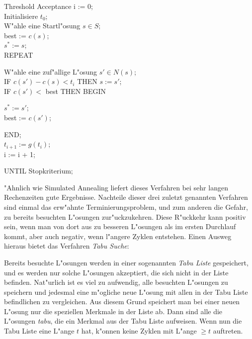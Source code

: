 \begin{algorithm}{Threshold Acceptance}
i := 0;\\
Initialisiere $t_0$;\\
W"ahle eine Startl"osung $s \in S$;\\
best := $c(s)$;\\
$s^* := s$;\\
{REPEAT}
\begin{Block}
	W"ahle eine zuf"allige L"osung $s' \in N(s)$;\\
	{IF} $c(s') - c(s) < t_i$ {THEN} $s := s'$;\\
	{IF} $c(s') < $ best {THEN BEGIN}
	\begin{Block}
		$s^* := s'$;\\
		best := $c(s')$;
	\end{Block}
	{END};\\
	$t_{i+1} := g(t_i)$;\\
	i := i + 1;
\end{Block}
{UNTIL} Stopkriterium;
\end{algorithm}

"Ahnlich wie Simulated Annealing liefert dieses Verfahren bei sehr langen
Rechenzeiten gute Ergebnisse.
Nachteile dieser drei zuletzt genannten Verfahren sind einmal das
erw"ahnte Terminierungsproblem, und zum anderen die Gefahr, zu 
bereits besuchten L"osungen zur"uckzukehren. 
Diese R"uckkehr kann positiv sein, wenn man von dort aus zu besseren
L"osungen als im ersten Durchlauf kommt, aber auch negativ, wenn
l"angere Zyklen entstehen.
Einen Ausweg hieraus bietet das Verfahren {\em Tabu Suche}:

Bereits besuchte L"osungen werden in einer sogenannten {\em Tabu Liste}
gespeichert, und es werden nur solche L"osungen akzeptiert, die
sich nicht in der Liste befinden. Nat"urlich ist es viel zu aufwendig,
alle besuchten L"osungen zu speichern und jedesmal eine m"ogliche
neue L"osung mit allen in der Tabu Liste befindlichen zu vergleichen.
Aus diesem Grund speichert man bei einer neuen L"osung nur die 
speziellen Merkmale in der Liste ab. Dann sind alle die L"osungen
{\em tabu}, die ein Merkmal aus der Tabu Liste aufweisen. 
Wenn nun die Tabu Liste eine L"ange $t$ hat, k"onnen keine Zyklen
mit L"ange $\geq t$ auftreten.

